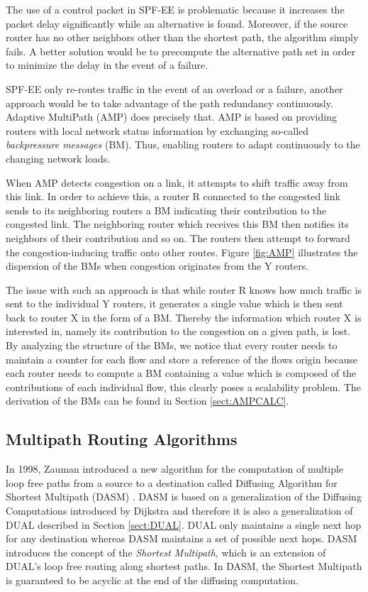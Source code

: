 The use of a control packet in SPF-EE is problematic because it increases the packet delay significantly while an alternative is found. Moreover, if the source router has no other neighbors other than the shortest path, the algorithm simply fails. A better solution would be to precompute the alternative path set in order to minimize the delay in the event of a failure.

SPF-EE only re-routes traffic in the event of an overload or a failure, another approach would be to take advantage of the path redundancy continuously. Adaptive MultiPath (AMP) \cite{AMP} does precisely that. AMP is based on providing routers with local network status information by exchanging so-called \textit{backpressure messages} (BM). Thus, enabling routers to adapt continuously to the changing network loads.

When AMP detects congestion on a link, it attempts to shift traffic away from this link. In order to achieve this, a router R connected to the congested link sends to its neighboring routers a BM indicating their contribution to the congested link. The neighboring router which receives this BM then notifies its neighbors of their contribution and so on. The routers then attempt to forward the congestion-inducing traffic onto other routes. Figure \ref{fig:AMP} illustrates the dispersion of the BMs when congestion originates from the Y routers.


The issue with such an approach is that while router R knows how much traffic is sent to the individual Y routers, it generates a single value which is then sent back to router X in the form of a BM. Thereby the information which router X is interested in, namely its contribution to the congestion on a given path, is lost. By analyzing the structure of the BMs, we notice that every router needs to maintain a counter for each flow and store a reference of the flows origin because each router needs to compute a BM containing a value which is composed of the contributions of each individual flow, this clearly poses a scalability problem. The derivation of the BMs can be found in Section \ref{sect:AMPCALC}. 

\subsection{Multipath Routing Algorithms}

In 1998, Zauman introduced a new algorithm for the computation of multiple loop free paths from a source to a destination called Diffusing Algorithm for Shortest Multipath (DASM) \cite{DASM}. DASM is based on a generalization of the Diffusing Computations introduced by Dijkstra \cite{DijkstraTerm} and therefore it is also a generalization of DUAL \cite{DUAL} described in Section \ref{sect:DUAL}. DUAL only maintains a single next hop for any destination whereas DASM maintains a set of possible next hops. DASM introduces the concept of the \textit{Shortest Multipath}, which is an extension of DUAL's loop free routing along shortest paths. In DASM, the Shortest Multipath is guaranteed to be acyclic at the end of the diffusing computation.

